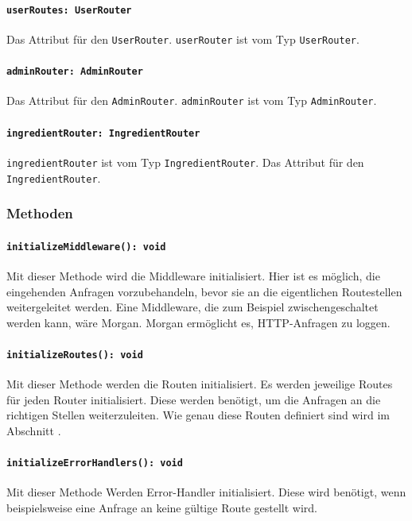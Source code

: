 \documentclass{entwurfsheft}
\begin{document}
\paragraph{\texttt{userRoutes: UserRouter}}
Das Attribut für den \texttt{UserRouter}. \texttt{userRouter} ist vom Typ \newline
\texttt{UserRouter}.
\paragraph{\texttt{adminRouter: AdminRouter}}
Das Attribut für den \texttt{AdminRouter}. \texttt{adminRouter} ist vom Typ \texttt{AdminRouter}.
\paragraph{\texttt{ingredientRouter: IngredientRouter}}
\texttt{ingredientRouter} ist vom Typ \texttt{IngredientRouter}.
Das Attribut für den \texttt{IngredientRouter}. \newline

\subsubsection*{Methoden}
\paragraph{\texttt{initializeMiddleware(): void}}
Mit dieser Methode wird die Middleware initialisiert. Hier ist es möglich, die eingehenden Anfragen vorzubehandeln, bevor sie an die eigentlichen Routestellen weitergeleitet werden.
Eine Middleware, die zum Beispiel zwischengeschaltet werden kann, wäre Morgan. Morgan ermöglicht es, HTTP-Anfragen zu loggen.
\paragraph{\texttt{initializeRoutes(): void}}
Mit dieser Methode werden die Routen initialisiert.
Es werden jeweilige Routes für jeden Router initialisiert. Diese werden benötigt, um die Anfragen an die richtigen Stellen weiterzuleiten.
Wie genau diese Routen definiert sind wird im Abschnitt .
\paragraph{\texttt{initializeErrorHandlers(): void}}
Mit dieser Methode Werden Error-Handler initialisiert. Diese wird benötigt, wenn beispielsweise eine Anfrage an keine gültige Route gestellt wird.
\end{document}
